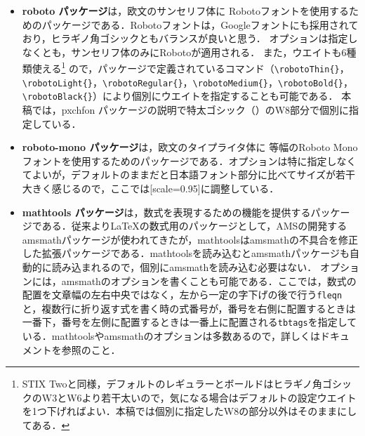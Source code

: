 \begin{itemize}
ところで，STIX Two TextフォントはMacOSにも{\TeX}のディレクトリの中にも4ウエイト分がインストールされているが，{\TeX}で使えるようにするメトリックファイルは2ウエイト分しか用意されていない．ヒラギノの明朝体も2ウエイトのみなのでバランスは取れているが，{\TeX}で使えるのは，ローマン体，イタリック体，スモールキャピタル体がそれぞれ2ウエイト\footnote{レギュラーとボールドが使用されるが，それぞれヒラギノ明朝のW3とW6より若干太いのは気になる．\label{太い}}のみである．また，サンセリフ体やタイプライタ体がない（STIX Two Mathにはどちらもあるが，本文中で使うとバランスが悪い）ため，それらには別のフォントを指定する必要がある．

\item{\sffamily\bfseries roboto パッケージ}は，欧文のサンセリフ体に
Robotoフォントを使用するためのパッケージである\cite{roboto}．Robotoフォントは，Googleフォントにも採用されており，ヒラギノ角ゴシックともバランスが良いと思う．
オプションは指定しなくとも，サンセリフ体のみにRobotoが適用される．
また，ウエイトも6種類使える\footnote{STIX Twoと同様，デフォルトのレギュラーとボールドはヒラギノ角ゴシックのW3とW6より若干太いので，気になる場合はデフォルトの設定ウエイトを1つ下げればよい．本稿では個別に指定したW8の部分以外はそのままにしてある．\label{太い2}}
ので，パッケージで定義されているコマンド（\verb|\robotoThin{}|，\verb|\robotoLight{}|，\verb|\robotoRegular{}|，\verb|\robotoMedium{}|，\verb|\robotoBold{}|，\verb|\robotoBlack{}|）により個別にウエイトを指定することも可能である．
本稿では，pxchfon パッケージの説明で{\gtfamily\ebseries 特太ゴシック（）}のW8部分で個別に指定している．

\item{\sffamily\bfseries roboto-mono パッケージ}は，欧文のタイプライタ体に
等幅のRoboto Monoフォントを使用するためのパッケージである\cite{roboto}．オプションは特に指定しなくてよいが，デフォルトのままだと日本語フォント部分に比べてサイズが若干大きく感じるので，ここでは[scale=0.95]に調整している．



\item{\sffamily\bfseries mathtools パッケージ}は，数式を表現するための機能を提供するパッケージである\cite{mathtools}．従来より{\LaTeX}の数式用のパッケージとして，AMSの開発するamsmathパッケージが使われてきたが，mathtoolsはamsmathの不具合を修正した拡張パッケージである．mathtoolsを読み込むとamsmathパッケージも自動的に読み込まれるので，個別にamsmathを読み込む必要はない．
オプションには，amsmathのオプションを書くことも可能である．ここでは，数式の配置を文章幅の左右中央ではなく，左から一定の字下げの後で行う\texttt{fleqn}と，複数行に折り返す式を書く時の式番号が，番号を右側に配置するときは一番下，番号を左側に配置するときは一番上に配置される\texttt{tbtags}を指定している．mathtoolsやamsmathのオプションは多数あるので，詳しくはドキュメントを参照のこと．


\end{itemize}
